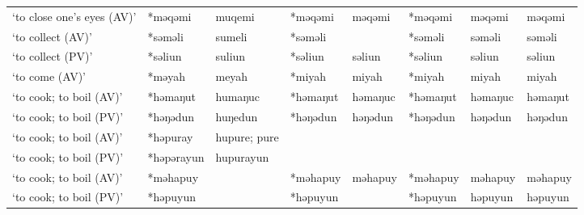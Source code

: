 \begin{landscape}
\begin{longtable}[c]{@{}p{3cm}<{\raggedright}p{2.75cm}<{\raggedright}p{2.75cm}<{\raggedright}p{2.75cm}<{\raggedright}p{2.75cm}<{\raggedright}p{2.75cm}<{\raggedright}p{2.75cm}<{\raggedright}p{2.75cm}<{\raggedright}@{}}
`to close one's eyes (AV)'                           & *məqəmi            & muqemi                         & *məqəmi            & məqəmi                     & *məqəmi          & məqəmi                   & məqəmi                            \\
`to collect (AV)'                                    & *səməli            & sumeli                         & *səməli            &                            & *səməli          & səməli                   & səməli                            \\
`to collect (PV)'                                    & *səliun            & suliun                         & *səliun            & səliun                     & *səliun          & səliun                   & səliun                            \\
`to come (AV)'                                       & *məyah             & meyah                          & *miyah             & miyah                      & *miyah           & miyah                    & miyah                             \\
`to cook; to boil (AV)'                              & *həmaŋut           & humaŋuc                        & *həmaŋut           & həmaŋuc                    & *həmaŋut         & həmaŋuc                  & həmaŋut                           \\
`to cook; to boil (PV)'                              & *həŋədun           & huŋedun                        & *həŋədun           & həŋədun                    & *həŋədun         & həŋədun                  & həŋədun                           \\
`to cook; to boil (AV)'                              & *həpuray           & hupure; pure                   &                    &                            &                  &                          &                                   \\
`to cook; to boil (PV)'                              & *həpərayun         & hupurayun                      &                    &                            &                  &                          &                                   \\
`to cook; to boil (AV)'                              & *məhapuy           &                                & *məhapuy           & məhapuy                    & *məhapuy         & məhapuy                  & məhapuy                           \\
`to cook; to boil (PV)'                              & *həpuyun           &                                & *həpuyun           &                            & *həpuyun         & həpuyun                  & həpuyun                           \\

\end{longtable}
\end{landscape}
